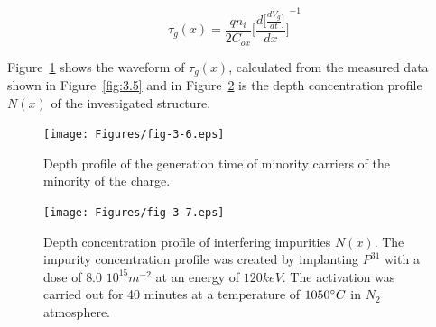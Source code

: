 \begin{equation}\label{eq:3.10}
  \tau_g(x) = \frac{qn_i}{2C_{ox}} {\Bigg[\frac{d\big[\frac{dV_g}{dt}\big]}{dx}\Bigg]}^{-1}
\end{equation}

Figure~\ref{fig:3.6} shows the waveform of $\tau_g(x)$, calculated
from the measured data shown in Figure~\ref{fig:3.5} and in
Figure~\ref{fig:3.7} is the depth concentration profile $N(x)$ of the investigated
structure.

\begin{figure}[h!]\centering
  \texttt{[image: Figures/fig-3-6.eps]}
  \caption[Depth profile of the generation lifetime of minority carriers
    charge]{Depth profile of the generation time of minority carriers
    of the minority of the charge.}\label{fig:3.6}
\end{figure}

\begin{figure}[h!]\centering
  \texttt{[image: Figures/fig-3-7.eps]}
  \caption[Depth profile of concentration of interfering impurities
    $N(x)$]{Depth concentration profile of interfering impurities
    $N(x)$. The impurity concentration profile was created by implanting
    $P^{31}$ with a dose of $8.0$ $10^{15}m^{-2}$ at an energy of $120 keV$.
    The activation was carried out for 40 minutes at a temperature of $1050 \degree C$ in
    $N_2$ atmosphere.}\label{fig:3.7}
\end{figure}


